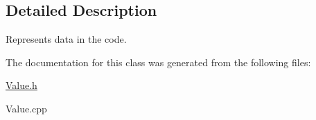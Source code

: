 \subsection{Detailed Description}
Represents data in the code. 

The documentation for this class was generated from the following files\+:\begin{DoxyCompactItemize}
\item 
\hyperlink{_value_8h}{Value.\+h}\item 
Value.\+cpp\end{DoxyCompactItemize}
